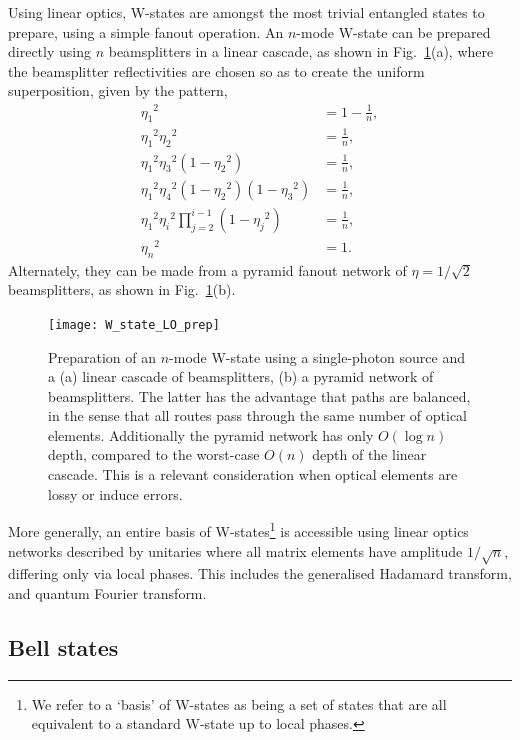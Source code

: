 Using linear optics, W-states are amongst the most trivial entangled states to prepare, using a simple fanout operation. An $n$-mode W-state can be prepared directly using $n$ beamsplitters in a linear cascade, as shown in Fig.~\ref{fig:W_state_LO_prep}(a), where the beamsplitter reflectivities are chosen so as to create the uniform superposition, given by the pattern,
\begin{align}
	{\eta_1}^2 &= 1 - \frac{1}{n},\nonumber\\
	{\eta_1}^2 {\eta_2}^2 &= \frac{1}{n},\nonumber\\
	{\eta_1}^2 {\eta_3}^2 (1-{\eta_2}^2)  &= \frac{1}{n},\nonumber\\
	{\eta_1}^2 {\eta_4}^2(1-{\eta_2}^2) (1-{\eta_3}^2)  &= \frac{1}{n},\nonumber\\
	{\eta_1}^2 {\eta_i}^2 \prod_{j=2}^{i-1} (1-{\eta_j}^2) &= \frac{1}{n},\nonumber\\
	{\eta_n}^2 &= 1.
\end{align}
Alternately, they can be made from a pyramid fanout network of \mbox{$\eta=1/\sqrt{2}$} beamsplitters, as shown in Fig.~\ref{fig:W_state_LO_prep}(b).

\begin{figure}[!htb]
\texttt{[image: W\_state\_LO\_prep]}
\captionspacefig \caption{Preparation of an $n$-mode W-state using a single-photon source and a (a) linear cascade of beamsplitters, (b) a pyramid network of beamsplitters. The latter has the advantage that paths are balanced, in the sense that all routes pass through the same number of optical elements. Additionally the pyramid network has only \mbox{$O(\log n)$} depth, compared to the worst-case \mbox{$O(n)$} depth of the linear cascade. This is a relevant consideration when optical elements are lossy or induce errors.}\label{fig:W_state_LO_prep}	
\end{figure}

More generally, an entire basis of W-states\footnote{We refer to a `basis' of W-states as being a set of states that are all equivalent to a standard W-state up to local phases.} is accessible using linear optics networks described by unitaries where all matrix elements have amplitude $1/\sqrt{n}$, differing only via local phases. This includes the generalised Hadamard transform, and quantum Fourier transform.

%
%

\subsection{Bell states} \label{sec:bell_state_res} 

